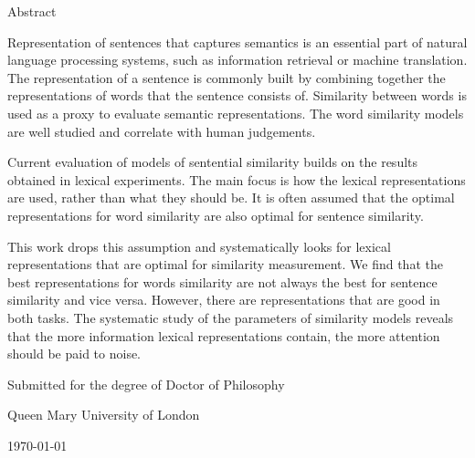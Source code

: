{\Large \headingfont \thetitle}

\vspace{1em}

{\large \headingfont \theauthor}

\vspace{1em}

{\headingfont Abstract}

Representation of sentences that captures semantics is an essential part of natural language processing systems, such as information retrieval or machine translation. The representation of a sentence is commonly built by combining together the representations of words that the sentence consists of. Similarity between words is used as a proxy to evaluate semantic representations. The word similarity models are well studied and correlate with human judgements.

Current evaluation of models of sentential similarity builds on the results obtained in lexical experiments. The main focus is how the lexical representations are used, rather than what they should be. It is often assumed that the optimal representations for word similarity are also optimal for sentence similarity.

This work drops this assumption and systematically looks for lexical representations that are optimal for similarity measurement. We find that the best representations for words similarity are not always the best for sentence similarity and vice versa. However, there are representations that are good in both tasks. The systematic study of the parameters of similarity models reveals that the more information lexical representations contain, the more attention should be paid to noise.

\vfill


Submitted for the degree of Doctor of Philosophy

Queen Mary University of London

\today


